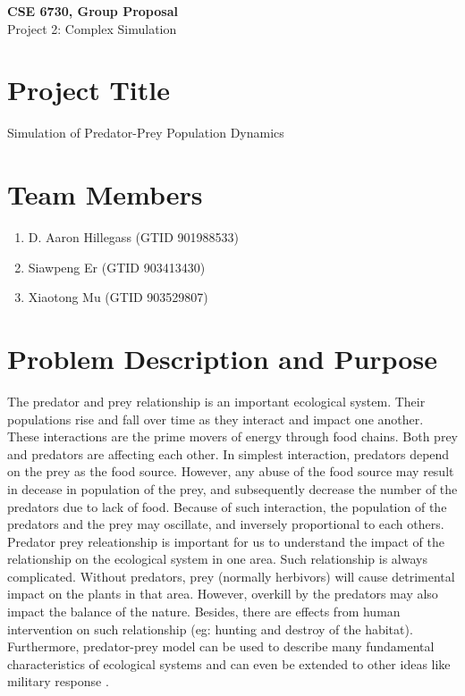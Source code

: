 \documentclass{article}
\begin{document}
	\begin{center}
		
		\LARGE{\textbf{CSE 6730, Group Proposal}} \\
		\vspace{1em}
		\Large{Project 2: Complex Simulation} \\
		
	\end{center}
	\begin{normalsize}
		
		\section{Project Title}
		
		Simulation of Predator-Prey Population Dynamics
		
		\section{Team Members}
		
		\begin{enumerate}
			\item D. Aaron Hillegass (GTID 901988533)
			\item Siawpeng Er (GTID 903413430)
			\item Xiaotong Mu (GTID 903529807)
		\end{enumerate}
		
		\section{Problem Description and Purpose}
		The predator and prey relationship is an important ecological system. Their populations rise and fall over time as they interact and impact one another. These interactions are the prime movers of energy through food chains. Both prey and predators are affecting each other. In simplest interaction, predators depend on the prey as the food source. However, any abuse of the food source may result in decease in population of the prey, and subsequently decrease the number of the predators due to lack of food. Because of such interaction, the population of the predators and the prey may oscillate, and inversely proportional to each others.  \\
		
		Predator prey releationship is important for us to understand the impact of the relationship on the ecological system in one area. Such relationship is always complicated. Without predators, prey (normally herbivors) will cause detrimental impact on the plants in that area. However, overkill by the predators may also impact the balance of the nature. Besides, there are effects from human intervention on such relationship (eg: hunting and destroy of the habitat). Furthermore, predator-prey model can be used to describe many fundamental characteristics of ecological systems and can even be extended to other ideas like military response \cite{derrik}.\\
		

\end{normalsize}
\end{document}
